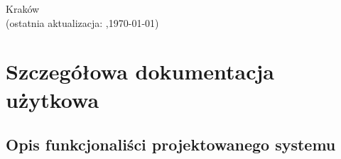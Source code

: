 \documentclass[12pt,a4paper,oneside]{article}
\theoremstyle{definition}
\numberwithin{equation}{section}
\begin{document}
\begin{titlepage}
\vspace*{\fill}
\begin{center}
\large
Kraków \the\year\\
(ostatnia aktualizacja: \DTMcurrenttime,\;\today)
\end{center}
\end{titlepage}
\setcounter{page}{0} 
\newpage\null\thispagestyle{empty}

\tableofcontents


\newpage

\section{Szczegółowa dokumentacja użytkowa}
\subsection{Opis funkcjonaliści projektowanego systemu}
\end{document}
